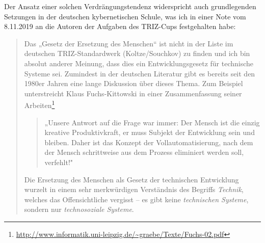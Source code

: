 \documentclass[11pt,a4paper]{article}
\begin{document}
Der Ansatz einer solchen Verdrängungstendenz widerspricht auch grundlegenden
Setzungen in der deutschen kybernetischen Schule, was ich in einer Note vom
8.11.2019 an die Autoren der Aufgaben des TRIZ-Cups festgehalten habe:
\begin{quote}
  Das „Gesetz der Ersetzung des Menschen“ ist nicht in der Liste im deutschen
  TRIZ-Standardwerk (Koltze/Souchkov) zu finden und ich bin absolut anderer
  Meinung, dass dies ein Entwicklungsgesetz für technische Systeme sei.
  Zumindest in der deutschen Literatur gibt es bereits seit den 1980er Jahren
  eine lange Diskussion über dieses Thema. Zum Beispiel unterstreicht Klaus
  Fuchs-Kittowski in einer Zusammenfassung seiner
  Arbeiten\footnote{\url{http://www.informatik.uni-leipzig.de/~graebe/Texte/Fuchs-02.pdf}}
  \begin{quote}
    „Unsere Antwort auf die Frage war immer: Der Mensch ist die einzig kreative
    Produktivkraft, er muss Subjekt der Entwicklung sein und bleiben.  Daher
    ist das Konzept der Vollautomatisierung, nach dem der Mensch schrittweise
    aus dem Prozess eliminiert werden soll, verfehlt!"
  \end{quote}
  Die Ersetzung des Menschen als Gesetz der technischen Entwicklung wurzelt in
  einem sehr merkwürdigen Verständnis des Begriffs \emph{Technik}, welches das
  Offensichtliche vergisst -- es gibt keine \emph{technischen Systeme},
  sondern nur \emph{technosoziale Systeme}.
\end{quote}
\end{document}

